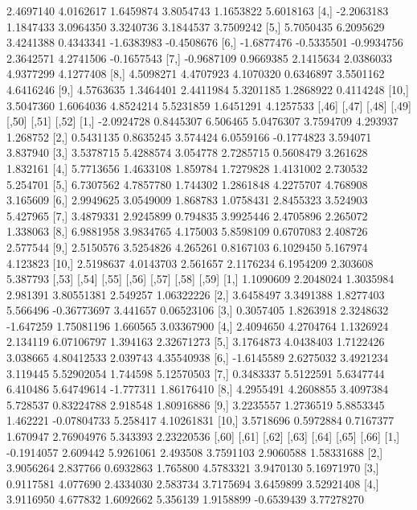 \documentclass[12pt]{article}
\begin{document}
\begin{Schunk}
\begin{Soutput}
 [3,]  2.4697140  4.0162617  1.6459874 3.8054743  1.1653822  5.6018163
 [4,] -2.2063183  1.1847433  3.0964350 3.3240736  3.1844537  3.7509242
 [5,]  5.7050435  6.2095629  3.4241388 0.4343341 -1.6383983 -0.4508676
 [6,] -1.6877476 -0.5335501 -0.9934756 2.3642571  4.2741506 -0.1657543
 [7,] -0.9687109  0.9669385  2.1415634 2.0386033  4.9377299  4.1277408
 [8,]  4.5098271  4.4707923  4.1070320 0.6346897  3.5501162  4.6416246
 [9,]  4.5763635  1.3464401  2.4411984 5.3201185  1.2868922  0.4114248
[10,]  3.5047360  1.6064036  4.8524214 5.5231859  1.6451291  4.1257533
           [,46]     [,47]    [,48]     [,49]      [,50]    [,51]    [,52]
 [1,] -2.0924728 0.8445307 6.506465 5.0476307  3.7594709 4.293937 1.268752
 [2,]  0.5431135 0.8635245 3.574424 6.0559166 -0.1774823 3.594071 3.837940
 [3,]  3.5378715 5.4288574 3.054778 2.7285715  0.5608479 3.261628 1.832161
 [4,]  5.7713656 1.4633108 1.859784 1.7279828  1.4131002 2.730532 5.254701
 [5,]  6.7307562 4.7857780 1.744302 1.2861848  4.2275707 4.768908 3.165609
 [6,]  2.9949625 3.0549009 1.868783 1.0758431  2.8455323 3.524903 5.427965
 [7,]  3.4879331 2.9245899 0.794835 3.9925446  2.4705896 2.265072 1.338063
 [8,]  6.9881958 3.9834765 4.175003 5.8598109  0.6707083 2.408726 2.577544
 [9,]  2.5150576 3.5254826 4.265261 0.8167103  6.1029450 5.167974 4.123823
[10,]  2.5198637 4.0143703 2.561657 2.1176234  6.1954209 2.303608 5.387793
           [,53]     [,54]     [,55]     [,56]       [,57]     [,58]      [,59]
 [1,]  1.1090609 2.2048024 1.3035984  2.981391  3.80551381  2.549257 1.06322226
 [2,]  3.6458497 3.3491388 1.8277403  5.566496 -0.36773697  3.441657 0.06523106
 [3,]  0.3057405 1.8263918 2.3248632 -1.647259  1.75081196  1.660565 3.03367900
 [4,]  2.4094650 4.2704764 1.1326924  2.134119  6.07106797  1.394163 2.32671273
 [5,]  3.1764873 4.0438403 1.7122426  3.038665  4.80412533  2.039743 4.35540938
 [6,] -1.6145589 2.6275032 3.4921234  3.119445  5.52902054  1.744598 5.12570503
 [7,]  0.3483337 5.5122591 5.6347744  6.410486  5.64749614 -1.777311 1.86176410
 [8,]  4.2955491 4.2608855 3.4097384  5.728537  0.83224788  2.918548 1.80916886
 [9,]  3.2235557 1.2736519 5.8853345  1.462221 -0.07804733  5.258417 4.10261831
[10,]  3.5718696 0.5972884 0.7167377  1.670947  2.76904976  5.343393 2.23220536
           [,60]    [,61]      [,62]    [,63]     [,64]      [,65]       [,66]
 [1,] -0.1914057 2.609442  5.9261061 2.493508 3.7591103  2.9060588  1.58331688
 [2,]  3.9056264 2.837766  0.6932863 1.765800 4.5783321  3.9470130  5.16971970
 [3,]  0.9117581 4.077690  2.4334030 2.583734 3.7175694  3.6459899  3.52921408
 [4,]  3.9116950 4.677832  1.6092662 5.356139 1.9158899 -0.6539439  3.77278270

\end{Soutput}
\end{Schunk}
\end{document}
